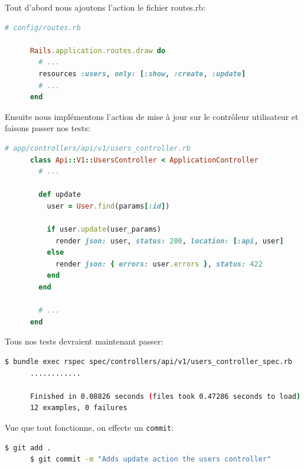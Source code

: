 \documentclass[]{report}
\begin{document}
      Tout d'abord nous ajoutons l'action le fichier routes.rb:

      \begin{scriptsize}
      \begin{lstlisting}[language=ruby]
      # config/routes.rb

      Rails.application.routes.draw do
        # ...
        resources :users, only: [:show, :create, :update]
        # ...
      end
      \end{lstlisting}
      \end{scriptsize}

      Ensuite nous implémentons l'action de mise à jour sur le contrôleur utilisateur et faisons passer nos tests:

      \begin{scriptsize}
      \begin{lstlisting}[language=ruby]
      # app/controllers/api/v1/users_controller.rb
      class Api::V1::UsersController < ApplicationController
        # ...

        def update
          user = User.find(params[:id])

          if user.update(user_params)
            render json: user, status: 200, location: [:api, user]
          else
            render json: { errors: user.errors }, status: 422
          end
        end

        # ...
      end
      \end{lstlisting}
      \end{scriptsize}

      Tous nos tests devraient maintenant passer:

      \begin{scriptsize}
      \begin{lstlisting}[language=bash]
      $ bundle exec rspec spec/controllers/api/v1/users_controller_spec.rb
      ............

      Finished in 0.08826 seconds (files took 0.47286 seconds to load)
      12 examples, 0 failures
      \end{lstlisting}
      \end{scriptsize}

      Vue que tout fonctionne, on effecte un \verb|commit|:

      \begin{scriptsize}
      \begin{lstlisting}[language=bash]
      $ git add .
      $ git commit -m "Adds update action the users controller"
      \end{lstlisting}
      \end{scriptsize}
\end{document}
